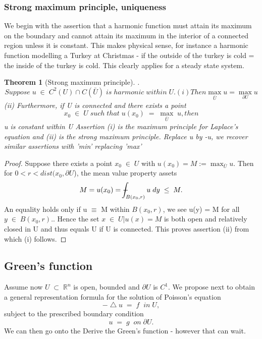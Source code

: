 \documentclass[a4paper,10pt]{article}
\numberwithin{equation}{section}
\numberwithin{figure}{section}
\def\Xint#1{\mathchoice
{\XXint\displaystyle\textstyle{#1}}%
{\XXint\textstyle\scriptstyle{#1}}%
{\XXint\scriptstyle\scriptscriptstyle{#1}}%
{\XXint\scriptscriptstyle\scriptscriptstyle{#1}}%
\!\int}
\def\XXint#1#2#3{{\setbox0=\hbox{$#1{#2#3}{\int}$ }
\vcenter{\hbox{$#2#3$ }}\kern-.6\wd0}}
\def\dashint{\Xint-}
\theoremstyle{plain}
\newtheorem{theorem}{Theorem}[section]
\begin{document}
\subsubsection{Strong maximum principle, uniqueness}
We begin with the assertion that a harmonic function must attain its maximum on the boundary and cannot
attain its maximum in the interior of a connected region unless it is constant.
This makes physical sense, for instance a harmonic function modelling a Turkey at Christmas - if the outside
of the turkey is cold = the inside of the turkey is cold. This clearly applies for a steady state system.
\begin{theorem}[Strong maximum principle].
 \begin{displaymath}
  Suppose\;u\;\in\;C^{2}(U)\cap C(\bar{U})\;is\;harmonic\;within\;U.
(i) Then
\max_{\bar{U}} u = \max_{\partial U} u
 \end{displaymath}
(ii) Furthermore, if U is connected and there exists a point
\begin{displaymath}
 x_{0}\;\in\;U\; such\; that\;u(x_{0})\;=\;\max_{\bar{U}}\; u, 
then \end{displaymath}
u is constant within U
Assertion (i) is the \textit{maximum principle} for Laplace's equation and 
(ii) is the \textit{strong maximum principle}. 
Replace u by -u, we recover similar assertions with 'min' replacing 'max'
\end{theorem}
\begin{proof}Suppose there exists a point $x_{0}\;\in\;U$ with $u(x_{0})=M:=\max_{\bar{U}}u.$
Then for $0 < r < dist(x_{0},\partial U$), the mean value property assets
\begin{displaymath}
 M = u(x_{0})=\dashint_{B(x_{0},r)}u\;dy\; \leq\; M.
\end{displaymath}
An equality holds only if u $\equiv$ M within $B(x_{0},r)$, we see u(y) = M for all 
$y\;\in\;B(x_{0},r).$. Hence the set ${x\;\in\;U|u(x)=M}$ is both open and relatively closed in U and 
thus equals U if U is connected. This proves assertion (ii) from which (i) follows. 
\end{proof}
\subsection{Green's function}
Assume now $U\;\subset\;\mathbb{R}^{n}$ is open, bounded and $\partial U$ is $C^{1}$. We propose
next to obtain a general representation formula for the solution of Poisson's equation
\begin{displaymath}
 -\bigtriangleup u\;=\;f\;\;in\;U,
\end{displaymath}
subject to the prescribed boundary condition
\begin{displaymath}
 u\;=\;g\;\;on\;\partial U.
\end{displaymath}
We can then go onto the Derive the Green's function - however that can wait. 
\newpage


\end{document}
